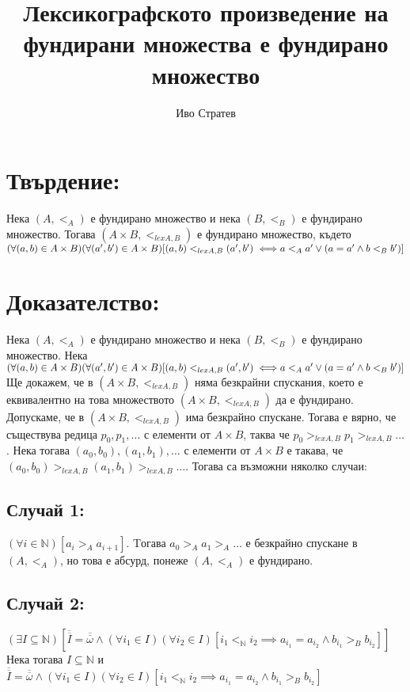 \documentclass[a4paper, 12pt, oneside]{article}
\title{Лексикографското произведение на фундирани множества е фундирано множество}
\author{Иво Стратев}
\begin{document}
\maketitle
\section*{Твърдение:}
Нека \((A, <_A)\) е фундирано множество и нека \((B, <_B)\) е фундирано множество.
Тогава \((A \times B, <_{lex A, B})\) е фундирано множество, където \\
\((\forall (a, b) \in A \times B)(\forall (a', b') \in A \times B)[(a, b) <_{lex A, B} (a', b') \iff \\
a <_A a' \lor (a = a' \land b <_B b')]\)
\section*{Доказателство:} 
Нека \((A, <_A)\) е фундирано множество и нека \((B, <_B)\) е фундирано множество.
Нека \((\forall (a, b) \in A \times B)(\forall (a', b') \in A \times B)[(a, b) <_{lex A, B} (a', b') \iff \\
a <_A a' \lor (a = a' \land b <_B b')]\) \\
Ще докажем, че в \((A \times B, <_{lex A, B})\) няма безкрайни спускания,
което е еквивалентно на това множеството \((A \times B, <_{lex A, B})\) да е фундирано. \\
Допускаме, че в \((A \times B, <_{lex A, B})\) има безкрайно спускане. Тогава е вярно,
че съществува редица \(p_0, p_1, \dots\) с елементи от \(A \times B\), таква че \(p_0 >_{lex A, B} p_1  >_{lex A, B} \dots\).
Нека тогава \((a_0, b_0), (a_1, b_1), \dots\) с елементи от \(A \times B\) е такава, че \((a_0, b_0) >_{lex A, B} (a_1, b_1) >_{lex A, B} \dots\).
Тогава са възможни няколко случаи:
\subsection*{Случай 1:}
\((\forall i \in \mathbb{N})[a_i >_A a_{i + 1}]\). Tогава \(a_0 >_A a_1 >_A \dots\) е безкрайно спускане в \((A, <_A)\),
но това е абсурд, понеже \((A, <_A)\) е фундирано.
\subsection*{Случай 2:}
\((\exists I \subseteq \mathbb{N})[\overline{\overline{I}} = \overline{\overline{\omega}} \land (\forall i_1 \in I)(\forall i_2 \in I)[i_1 <_{\mathbb{N}} i_2 \implies a_{i_1} = a_{i_2} \land b_{i_1} >_B b_{i_2}]]\) \\
Нека тогава \(I \subseteq \mathbb{N}\) и \(\overline{\overline{I}} = \overline{\overline{\omega}} \land (\forall i_1 \in I)(\forall i_2 \in I)[i_1 <_{\mathbb{N}} i_2 \implies a_{i_1} = a_{i_2} \land b_{i_1} >_B b_{i_2}]\)
\end{document}
